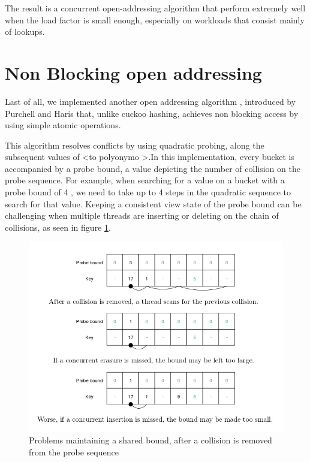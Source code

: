 The result is a concurrent open-addressing algorithm that perform extremely well when the load factor is small enough, especially on workloads that consist mainly of lookups.


\section{Non Blocking  open addressing}

Last of all, we implemented another open addressing algorithm , introduced by Purchell and Haris \cite{non_blocking_open_addressing} that, unlike cuckoo hashing,  achieves non blocking access by using simple atomic operations.

This algorithm resolves conflicts by using quadratic probing, along the subsequent values of <to polyonymo >.In this implementation, every bucket is accompanied by a probe bound, a value depicting the number of collision on the probe sequence. For example, when searching for a value on a bucket with a probe bound of 4 , we need to take up to 4 steps in the quadratic sequence to search for that value. Keeping a consistent view state of the probe bound can be challenging when multiple threads are inserting or deleting on the chain of collisions, as seen in figure \ref{non_blocking_1}.

\begin{figure}
 \centering
  \includegraphics[scale=0.5]{non_blocking_1.png}
\caption{Problems maintaining a shared bound, after a collision is removed from the probe sequence}
\label{non_blocking_1}
\end{figure}


